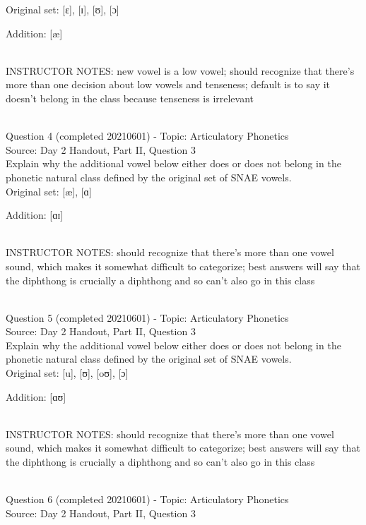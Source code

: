 \documentclass[12pt]{article}
\begin{document}
Original set: {[ɛ]}, {[ɪ]}, {[ʊ]}, {[ɔ]}

Addition: {[æ]}


~\\
INSTRUCTOR NOTES: new vowel is a low vowel; should recognize that there's more than one decision about low vowels and tenseness; default is to say it doesn't belong in the class because tenseness is irrelevant


~\\

{\large Question 4} (completed 20210601) - Topic: Articulatory Phonetics\\
Source: Day 2 Handout, Part II, Question 3\\

Explain why the additional vowel below either does or does not belong in the phonetic natural class defined by the original set of SNAE vowels.\\

Original set: {[æ]}, {[ɑ]}

Addition: {[ɑɪ]}


~\\
INSTRUCTOR NOTES: should recognize that there's more than one vowel sound, which makes it somewhat difficult to categorize; best answers will say that the diphthong is crucially a diphthong and so can't also go in this class


~\\

{\large Question 5} (completed 20210601) - Topic: Articulatory Phonetics\\
Source: Day 2 Handout, Part II, Question 3\\

Explain why the additional vowel below either does or does not belong in the phonetic natural class defined by the original set of SNAE vowels.\\

Original set: {[u]}, {[ʊ]}, {[oʊ]}, {[ɔ]}

Addition: {[ɑʊ]}


~\\
INSTRUCTOR NOTES: should recognize that there's more than one vowel sound, which makes it somewhat difficult to categorize; best answers will say that the diphthong is crucially a diphthong and so can't also go in this class


~\\

{\large Question 6} (completed 20210601) - Topic: Articulatory Phonetics\\
Source: Day 2 Handout, Part II, Question 3\\
\end{document}
